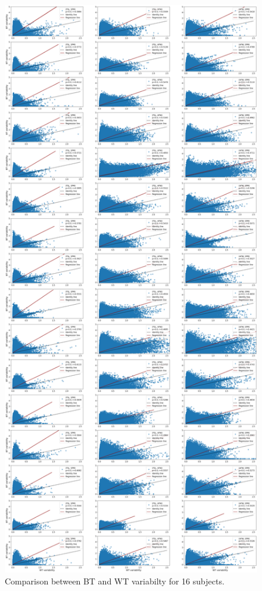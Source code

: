 \documentclass[11pt,onecolumn]{article}
\begin{document}
\begin{figure}[ht]
      \centering
      \includegraphics[width=.6\textwidth]{figures/sbj-std-corr-unthresh-plot.png}
      \caption{Comparison between BT and WT variabilty for 16 subjects.}
  \label{fig:unthresh-correlation-allsbj}
\end{figure}
\end{document}
